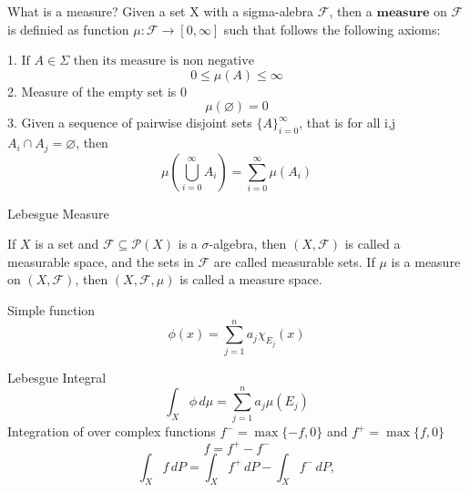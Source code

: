 \documentclass{beamer}
\begin{document}
\begin{frame}{What is a measure?}
  Given a set X with a sigma-alebra $\mathcal{F}$, then a $\textbf{measure}$ on $\mathcal{F}$ is definied as  function $\mu: \mathcal{F} \to [0,\infty]$ such that follows the following axioms:

   1. $\text{If } A\in \Sigma \text{ then its measure is non negative  }$
   \[
     0  \leq \mu(A) \leq \infty
   \]
   2. Measure of the empty set is 0 
   \[
      \mu(\varnothing) = 0 
   \]
   3. Given a sequence of pairwise disjoint sets $\{A\}_{i=0}^{\infty}$, that is for all i,j $A_i \cap A_j = \varnothing$, then 
  \[
      \mu\left(\bigcup_{i=0}^{\infty} A_i\right) = \sum_{i=0}^{\infty}\mu(A_i)
  \]
\end{frame}



\begin{frame}{Lebesgue Measure}

If \(X\) is a set and \(\mathcal{F} \subseteq \mathcal{P}(X)\) is a \(\sigma\)-algebra, then \((X,\mathcal{F})\) is called a measurable space, and the sets in \(\mathcal{F}\) are called measurable sets. If \(\mu\) is a measure on \((X,\mathcal{F})\), then \((X,\mathcal{F},\mu)\) is called a measure space.


Simple function 
\[
  \phi(x) = \sum_{j=1}^{n} a_j \chi_{E_j}(x)
\]

Lebesgue  Integral 
\[
  \int_X \phi\,d\mu = \sum_{j=1}^n a_j \mu(E_j)
\]
Integration of over complex functions 
$f^- = \max\{-f,0\}$ and $f^+ = \max\{f,0\}$
\[
  f = f^+ - f^- 
\]
\[
\int_X f\,dP
=
\int_X f^+\,dP
-
\int_X f^-\,dP,
\]

\end{frame}
\end{document}
